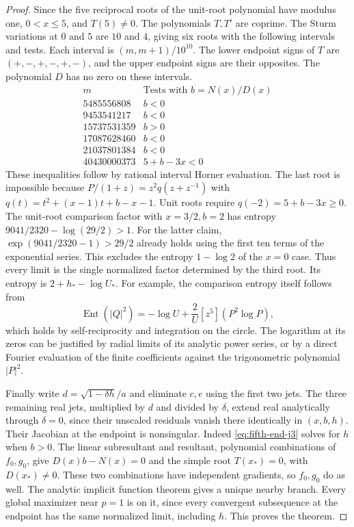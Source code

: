 \documentclass[11pt]{article}
\begin{document}
\begin{proof}
Since the five reciprocal roots of the unit-root polynomial
have modulus one, \(0<x\le5\), and \(T(5)\ne0\).
The polynomials \(T,T'\) are coprime. The Sturm variations at \(0\)
and \(5\) are \(10\) and \(4\), giving six roots with the following
intervals and tests. Each interval is \((m,m+1)/10^{10}\).
The lower endpoint signs of \(T\) are \((+,-,+,-,+,-)\), and the
upper endpoint signs are their opposites. The polynomial \(D\)
has no zero on these intervals.
\[
\begin{array}{r|l}
 m & \text{Tests with } b=N(x)/D(x)\\\hline
  5485556808 & b<0\\
  9453541217 & b<0\\
 15737531359 & b>0\\
 17087628460 & b<0\\
 21037801384 & b<0\\
 40430000373 & 5+b-3x<0
\end{array}
\]
These inequalities follow by rational interval Horner evaluation.
The last root is impossible because
\(P/(1+z)=z^2q(z+z^{-1})\) with
\(q(t)=t^2+(x-1)t+b-x-1\). Unit roots require
\(q(-2)=5+b-3x\ge0\).
The unit-root comparison factor with \(x=3/2,b=2\)
has entropy \(9041/2320-\log(29/2)>1\).
For the latter claim, \(\exp(9041/2320-1)>29/2\) already holds
using the first ten terms of the exponential series.
This excludes the entropy \(1-\log 2\) of the \(x=0\) case.
Thus every limit is the single normalized factor determined
by the third root. Its entropy is \(2+h_*-\log U_*\).
For example, the comparison entropy itself follows from
\[
 \operatorname{Ent}(|Q|^2)
 =-\log U+\frac{2}{U}[z^5](P^2\log P),
\]
which holds by self-reciprocity and integration on the circle.
The logarithm at its zeros can be justified by radial limits
of its analytic power series, or by a direct Fourier evaluation
of the finite coefficients against the trigonometric polynomial
\(|P|^2\).

Finally write \(d=\sqrt{1-\delta h}/a\) and eliminate \(c,e\)
using the first two jets. The three remaining real jets,
multiplied by \(d\) and divided by \(\delta\), extend real
analytically through \(\delta=0\), since their unscaled
residuals vanish there identically in \((x,b,h)\).
Their Jacobian at the endpoint is nonsingular. Indeed
\eqref{eq:fifth-end-j3} solves for \(h\) when \(b>0\).
The linear subresultant and resultant, polynomial combinations
of \(f_0,g_0\), give \(D(x)b-N(x)=0\) and the simple root
\(T(x_*)=0\), with \(D(x_*)\ne0\).
These two combinations have independent gradients, so \(f_0,g_0\)
do as well. The analytic implicit function theorem gives a unique
nearby branch. Every global maximizer near \(p=1\)
is on it, since every convergent subsequence at the endpoint
has the same normalized limit, including \(h\).
This proves the theorem.
\end{proof}
\end{document}
